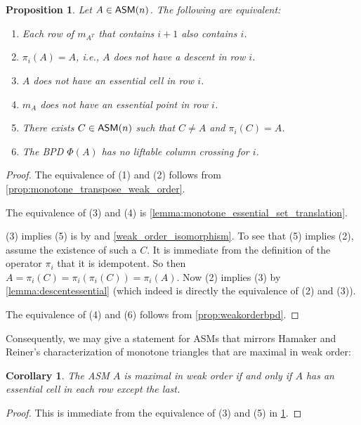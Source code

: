 \documentclass[12 pt]{amsart}
\newtheorem{corollary}[Theorem]{Corollary}
\newtheorem{proposition}[Theorem]{Proposition}
\numberwithin{equation}{section}
\newcommand{\asmtobpd}{\Phi}
\theoremstyle{remark}
\newcommand{\asm}{{\sf ASM}}
\begin{document}
\begin{proposition}
\label{equivalent-descent-conditions}
    Let $A\in \asm(n)$.  The following are equivalent:
    \begin{enumerate}
        \item Each row of $m_{A^T}$ that contains $i+1$ also contains $i$.
        \item $\pi_i(A)=A$, i.e., $A$ does not have a descent in row $i$.
        \item $A$ does not have an essential cell in row $i$.
        \item $m_A$ does not have an essential point in row $i$.
        \item There exists $C\in \asm(n)$ such that $C\neq A$ and $\pi_i(C)=A$.
        \item The BPD $\asmtobpd(A)$ has no liftable column crossing for $i$.
    \end{enumerate}
\end{proposition}
\begin{proof}
    The equivalence of (1) and (2) follows from \cref{prop:monotone_transpose_weak_order}.

The equivalence of (3) and (4) is \cref{lemma:monotone_essential_set_translation}.

     (3) implies (5) is by \cite[Lemma 6.2]{HR20} and \cref{weak_order_isomorphism}. To see that (5) implies (2), assume the existence of such a $C$. It is immediate from the definition of the operator $\pi_i$ that it is idempotent. So then $A = \pi_i(C) = \pi_i(\pi_i(C)) = \pi_i(A)$. Now (2) implies (3) by \cref{lemma:descentessential} (which indeed is directly the equivalence of (2) and (3)).

    The equivalence of (4) and (6) follows from \cref{prop:weakorderbpd}.
\end{proof}

Consequently, we may give a statement for ASMs that mirrors Hamaker and Reiner's \cite[Lemma 6.2]{HR20} characterization of monotone triangles that are maximal in weak order:

\begin{corollary}
\label{prop:maximal-iff-essential-cell-in-every-row}
    The ASM $A$ is maximal in weak order if and only if $A$ has an essential cell in each row except the last.
\end{corollary}
\begin{proof}
    This is immediate from the equivalence of (3) and (5) in \cref{equivalent-descent-conditions}.
\end{proof}
\end{document}
